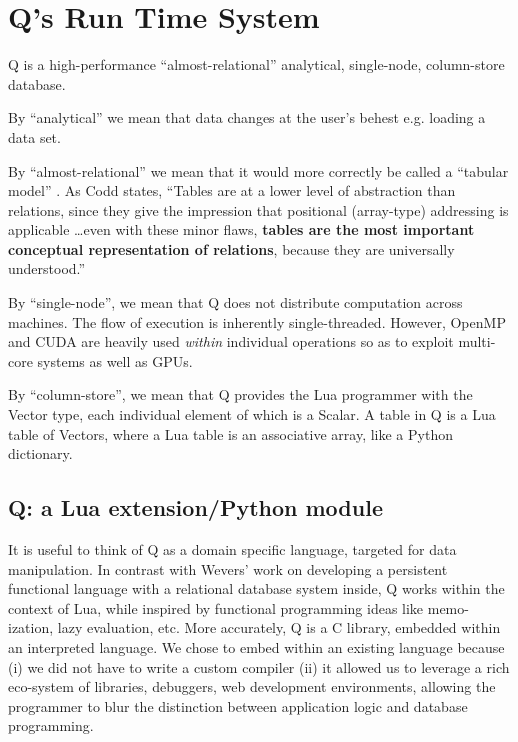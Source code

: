 \section{Q's Run Time System}

Q is a high-performance ``almost-relational'' 
analytical, single-node, column-store database. 
\be
\item 
By ``analytical'' we mean that data changes at the user's behest e.g.
loading a data set.
\item 
By ``almost-relational'' we mean that it would more correctly
be called a ``tabular model'' \cite{Codd1982}. As Codd states, ``Tables are
at a lower level of abstraction than relations, since they give
the impression that positional (array-type) addressing is applicable
\ldots even with these minor flaws,
{\bf tables are the most important conceptual representation of
relations}, because they are universally understood.''
\item By ``single-node'', we mean that Q does not distribute computation across
  machines. The flow of execution is inherently single-threaded. However,
  OpenMP and CUDA are heavily used {\em within} individual operations so as
  to exploit multi-core systems as well as GPUs.
\item By ``column-store'', we mean that 
Q provides the Lua programmer with the Vector type, each
individual element of which is a Scalar. A table in Q is a Lua
table of Vectors, where a Lua table is an
associative array, like a Python dictionary.

\ee

\subsection{Q: a Lua extension/Python module}


It is useful to think of Q as a domain specific language, targeted for data
manipulation. In contrast with Wevers' work \cite{Wevers2014} on
developing a persistent functional language with
a relational database system inside, Q works within the context of Lua, while
inspired by functional programming ideas like memo-ization, lazy evaluation,
etc.
More accurately, Q is a C library, embedded within an interpreted
language.
We chose to embed within an existing language because (i) we did not have to
write a custom compiler (ii) it allowed us to leverage a rich eco-system of
libraries, debuggers, web development environments, allowing the programmer to
blur the distinction between application logic and database programming.

